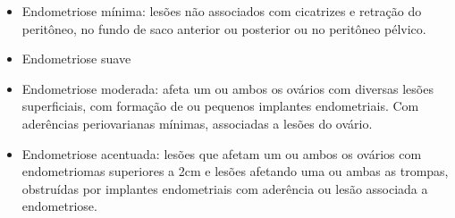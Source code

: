 \documentclass[12pt]{article} %
\begin{document}
\begin{itemize}
\item Endometriose mínima: lesões não associados com cicatrizes e
  retração do peritôneo, no fundo de saco anterior ou posterior ou no
  peritôneo pélvico.
\item Endometriose suave
\item Endometriose moderada: afeta um ou ambos os ovários com diversas
  lesões superficiais, com formação de  ou pequenos
  implantes endometriais. Com aderências periovarianas mínimas,
  associadas a lesões do ovário.
\item Endometriose acentuada: lesões que afetam um ou ambos os ovários
  com endometriomas superiores a 2cm e lesões afetando uma ou ambas as
  trompas, obstruídas por implantes endometriais com aderência ou
  lesão associada a endometriose.
\end{itemize}
\newpage
\end{document}
